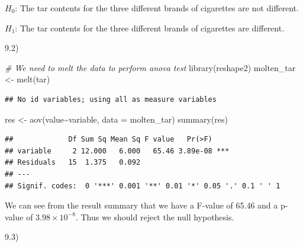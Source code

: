 \documentclass[
]{article}
\newenvironment{Shaded}{\begin{snugshade}}{\end{snugshade}}
\newcommand{\AttributeTok}[1]{\textcolor[rgb]{0.77,0.63,0.00}{#1}}
\newcommand{\CommentTok}[1]{\textcolor[rgb]{0.56,0.35,0.01}{\textit{#1}}}
\newcommand{\FunctionTok}[1]{\textcolor[rgb]{0.00,0.00,0.00}{#1}}
\newcommand{\NormalTok}[1]{#1}
\newcommand{\OtherTok}[1]{\textcolor[rgb]{0.56,0.35,0.01}{#1}}
\newcommand{\SpecialCharTok}[1]{\textcolor[rgb]{0.00,0.00,0.00}{#1}}
\begin{document}
\(H_0\): The tar contents for the three different brands of cigarettes
are not different.

\(H_1\): The tar contents for the three different brands of cigarettes
are different.

9.2)

\begin{Shaded}
\begin{Highlighting}[]
\CommentTok{\# We need to melt the data to perform anova test}
\FunctionTok{library}\NormalTok{(reshape2)}
\NormalTok{molten\_tar }\OtherTok{\textless{}{-}} \FunctionTok{melt}\NormalTok{(tar)}
\end{Highlighting}
\end{Shaded}

\begin{verbatim}
## No id variables; using all as measure variables
\end{verbatim}

\begin{Shaded}
\begin{Highlighting}[]
\NormalTok{res }\OtherTok{\textless{}{-}} \FunctionTok{aov}\NormalTok{(value}\SpecialCharTok{\textasciitilde{}}\NormalTok{variable, }\AttributeTok{data =}\NormalTok{ molten\_tar)}
\FunctionTok{summary}\NormalTok{(res)}
\end{Highlighting}
\end{Shaded}

\begin{verbatim}
##             Df Sum Sq Mean Sq F value   Pr(>F)    
## variable     2 12.000   6.000   65.46 3.89e-08 ***
## Residuals   15  1.375   0.092                     
## ---
## Signif. codes:  0 '***' 0.001 '**' 0.01 '*' 0.05 '.' 0.1 ' ' 1
\end{verbatim}

We can see from the result summary that we have a F-value of 65.46 and a
p-value of \(3.98\times 10^{-8}\). Thus we should reject the null
hypothesis.

9.3)
\end{document}
